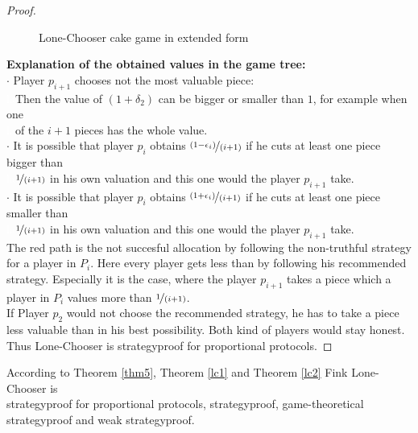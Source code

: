 \begin{proof}
\begin{figure}[h!]
\begin{center}
	\caption{Lone-Chooser cake game in extended form}
\end{center}
\end{figure}
\newline
\textbf{Explanation of the obtained values in the game tree:}\\
\newline
$\cdot$ Player $p_{i+1}$ chooses not the most valuable piece:\\\textcolor{white}{la}\textcolor{black}{}Then the value of $(1+\delta_2)$ can be bigger or smaller than $1$, for example when one\\\textcolor{white}{la}\textcolor{black}{}of the $i+1$ pieces has the whole value.\\
$\cdot$ It is possible that player $p_i$ obtains $\nicefrac{(1-\epsilon_i)}{(i+1)}$ if he cuts at least one piece bigger than\\\textcolor{white}{la}\textcolor{black}{}$\nicefrac{1}{(i+1)}$ in his own valuation and this one would the player $p_{i+1}$ take.
\\$\cdot$ It is possible that player $p_i$ obtains $\nicefrac{(1+\epsilon_i)}{(i+1)}$ if he cuts at least one piece smaller than\\\textcolor{white}{la}\textcolor{black}{}$\nicefrac{1}{(i+1)}$ in his own valuation and this one would the player $p_{i+1}$ take.\\
\newline
The red path is the not succesful allocation by following the non-truthful strategy for a player in $P_i$. Here every player gets less than by following his recommended strategy. Especially it is the case, where the player $p_{i+1}$ takes a piece which a player in $P_i$ values more than $\nicefrac{1}{(i+1)}$.\\If Player $p_2$ would not choose the recommended strategy, he has to take a piece less valuable than in his best possibility. Both kind of players would stay honest. Thus Lone-Chooser is strategyproof for proportional protocols.
\end{proof}
\begin{bezeichnungen}
According to Theorem \ref{thm5}, Theorem \ref{lc1} and Theorem \ref{lc2} Fink Lone-Chooser is\\strategyproof for proportional protocols, strategyproof, game-theoretical strategyproof and weak strategyproof.
\end{bezeichnungen}
\newpage
